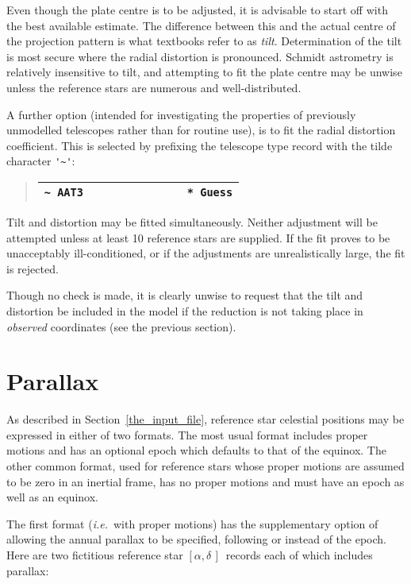 \documentclass[twoside,11pt]{article}
\newcommand{\xlabel}[1]{}
\renewcommand{\_}{\texttt{\symbol{95}}}
\newcommand{\radec}     {$[\alpha,\delta\,]$}
\begin{document}
Even though the plate centre is to be adjusted, it is advisable to start
off with the best available estimate.  The difference between this and
the actual centre of the projection pattern is what textbooks refer
to as \textit{tilt}.  Determination of the tilt is most secure where
the radial distortion is pronounced.  Schmidt astrometry is relatively
insensitive to tilt, and attempting to fit the plate centre may be unwise
unless the reference stars are numerous and well-distributed.

A further option (intended for investigating the properties of previously
unmodelled telescopes rather than for routine use), is to fit the radial
distortion coefficient.  This is selected by prefixing the telescope
type record with the tilde character \verb|'~'|:

\goodbreak
\begin{quote}
\begin{tabular}{|l|}
\hline
\verb|~ AAT3                * Guess| \\
\hline
\end{tabular}
\end{quote}

Tilt and distortion may be fitted simultaneously.  Neither adjustment will
be attempted unless at least 10 reference stars are supplied.  If the
fit proves to be unacceptably ill-conditioned, or if the adjustments
are unrealistically large, the fit is rejected.

Though no check is made, it is clearly unwise to request that the tilt
and distortion be included in the model if the reduction is not taking
place in \textit{observed} coordinates (see the previous section).

\section{\xlabel{section_parallax}Parallax}
\label{parallax}

As described in Section~\ref{the_input_file}, reference star celestial
positions may be expressed in either of two formats.  The most usual
format includes proper motions and has an optional epoch which defaults
to that of the equinox.  The other common format, used for reference
stars whose proper motions are assumed to be zero in an inertial frame,
has no proper motions and must have an epoch as well as an equinox.

The first format (\emph{i.e.}\ with proper motions) has the
supplementary option of allowing the annual parallax to be specified,
following or instead of the epoch.  Here are two fictitious
reference star \radec\ records each of which includes parallax:
\end{document}
